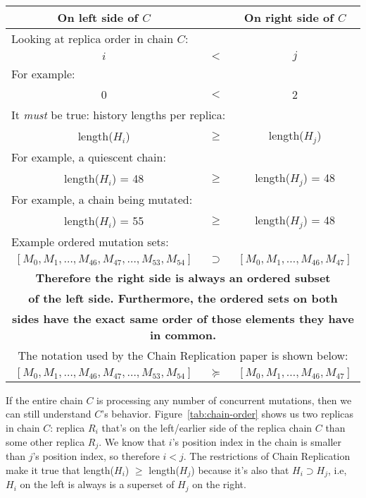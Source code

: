 \documentclass[preprint,10pt]{sigplanconf}
\begin{document}
\begin{figure*}
\centering
\begin{tabular}{ccc}
{\bf {{On left side of $C$}}} & & {\bf On right side of $C$} \\
\hline
\multicolumn{3}{l}{Looking at replica order in chain $C$:} \\
$i$ & $<$ & $j$ \\

\multicolumn{3}{l}{For example:} \\

0 & $<$ & 2 \\
\hline
\multicolumn{3}{l}{It {\em must} be true: history lengths per replica:} \\
length($H_i$) & $\geq$ & length($H_j$) \\
\multicolumn{3}{l}{For example, a quiescent chain:} \\
length($H_i$) = 48 & $\geq$ & length($H_j$) = 48 \\
\multicolumn{3}{l}{For example, a chain being mutated:} \\
length($H_i$) = 55 & $\geq$ & length($H_j$) = 48 \\
\multicolumn{3}{l}{Example ordered mutation sets:} \\
$[M_0,M_1,\ldots,M_{46},M_{47},\ldots,M_{53},M_{54}]$ & $\supset$ & $[M_0,M_1,\ldots,M_{46},M_{47}]$ \\
\multicolumn{3}{c}{\bf Therefore the right side is always an ordered
  subset} \\
\multicolumn{3}{c}{\bf of the left side.  Furthermore, the ordered
  sets on both} \\
\multicolumn{3}{c}{\bf sides have the exact same order of those elements they have in common.} \\
\multicolumn{3}{c}{The notation used by the Chain Replication paper is
shown below:} \\
$[M_0,M_1,\ldots,M_{46},M_{47},\ldots,M_{53},M_{54}]$ & $\succeq$ & $[M_0,M_1,\ldots,M_{46},M_{47}]$ \\

\end{tabular}
\caption{A demonstration of Chain Replication protocol history ``Update Propagation Invariant''.}
\label{tab:chain-order}
\end{figure*}

If the entire chain $C$ is processing any number of concurrent
mutations, then we can still understand $C$'s behavior.
Figure~\ref{tab:chain-order} shows us two replicas in chain $C$:
replica $R_i$ that's on the left/earlier side of the replica chain $C$
than some other replica $R_j$.  We know that $i$'s position index in
the chain is smaller than $j$'s position index, so therefore $i < j$.
The restrictions of Chain Replication make it true that length($H_i$)
$\ge$ length($H_j$) because it's also that $H_i \supset H_j$, i.e,
$H_i$ on the left is always is a superset of $H_j$ on the right.
\end{document}
